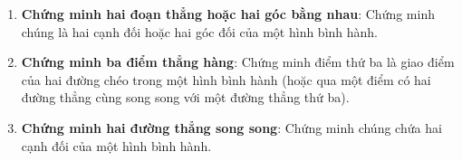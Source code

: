 \begin{enumerate}
\item \textbf{Chứng minh hai đoạn thẳng hoặc hai góc bằng nhau}: Chứng minh chúng là hai cạnh đối hoặc hai góc đối của một hình bình hành.
\item \textbf{Chứng minh ba điểm thẳng hàng}: Chứng minh điểm thứ ba là giao điểm của hai đường chéo trong một hình bình hành (hoặc qua một điểm có hai đường thẳng cùng song song với một đường thẳng thứ ba).
\item \textbf{Chứng minh hai đường thẳng song song}: Chứng minh chúng chứa hai cạnh đối của một hình bình hành.
\end{enumerate}
